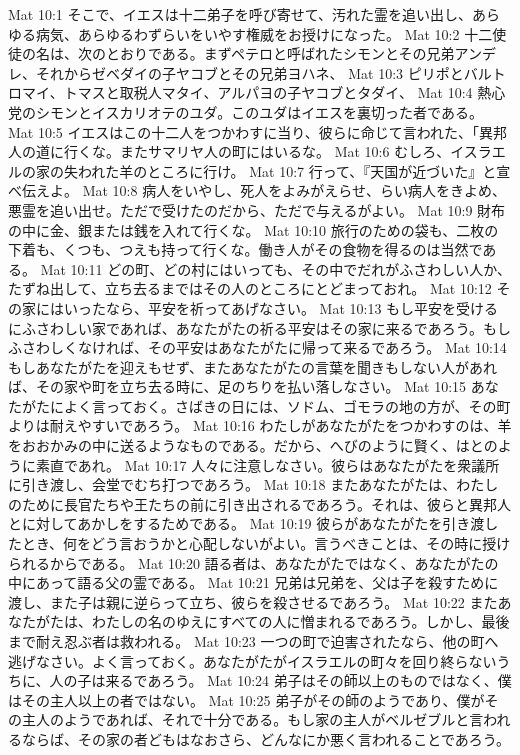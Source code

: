 Mat 10:1  そこで、イエスは十二弟子を呼び寄せて、汚れた霊を追い出し、あらゆる病気、あらゆるわずらいをいやす権威をお授けになった。
Mat 10:2  十二使徒の名は、次のとおりである。まずペテロと呼ばれたシモンとその兄弟アンデレ、それからゼベダイの子ヤコブとその兄弟ヨハネ、
Mat 10:3  ピリポとバルトロマイ、トマスと取税人マタイ、アルパヨの子ヤコブとタダイ、
Mat 10:4  熱心党のシモンとイスカリオテのユダ。このユダはイエスを裏切った者である。
Mat 10:5  イエスはこの十二人をつかわすに当り、彼らに命じて言われた、「異邦人の道に行くな。またサマリヤ人の町にはいるな。
Mat 10:6  むしろ、イスラエルの家の失われた羊のところに行け。
Mat 10:7  行って、『天国が近づいた』と宣べ伝えよ。
Mat 10:8  病人をいやし、死人をよみがえらせ、らい病人をきよめ、悪霊を追い出せ。ただで受けたのだから、ただで与えるがよい。
Mat 10:9  財布の中に金、銀または銭を入れて行くな。
Mat 10:10  旅行のための袋も、二枚の下着も、くつも、つえも持って行くな。働き人がその食物を得るのは当然である。
Mat 10:11  どの町、どの村にはいっても、その中でだれがふさわしい人か、たずね出して、立ち去るまではその人のところにとどまっておれ。
Mat 10:12  その家にはいったなら、平安を祈ってあげなさい。
Mat 10:13  もし平安を受けるにふさわしい家であれば、あなたがたの祈る平安はその家に来るであろう。もしふさわしくなければ、その平安はあなたがたに帰って来るであろう。
Mat 10:14  もしあなたがたを迎えもせず、またあなたがたの言葉を聞きもしない人があれば、その家や町を立ち去る時に、足のちりを払い落しなさい。
Mat 10:15  あなたがたによく言っておく。さばきの日には、ソドム、ゴモラの地の方が、その町よりは耐えやすいであろう。
Mat 10:16  わたしがあなたがたをつかわすのは、羊をおおかみの中に送るようなものである。だから、へびのように賢く、はとのように素直であれ。
Mat 10:17  人々に注意しなさい。彼らはあなたがたを衆議所に引き渡し、会堂でむち打つであろう。
Mat 10:18  またあなたがたは、わたしのために長官たちや王たちの前に引き出されるであろう。それは、彼らと異邦人とに対してあかしをするためである。
Mat 10:19  彼らがあなたがたを引き渡したとき、何をどう言おうかと心配しないがよい。言うべきことは、その時に授けられるからである。
Mat 10:20  語る者は、あなたがたではなく、あなたがたの中にあって語る父の霊である。
Mat 10:21  兄弟は兄弟を、父は子を殺すために渡し、また子は親に逆らって立ち、彼らを殺させるであろう。
Mat 10:22  またあなたがたは、わたしの名のゆえにすべての人に憎まれるであろう。しかし、最後まで耐え忍ぶ者は救われる。
Mat 10:23  一つの町で迫害されたなら、他の町へ逃げなさい。よく言っておく。あなたがたがイスラエルの町々を回り終らないうちに、人の子は来るであろう。
Mat 10:24  弟子はその師以上のものではなく、僕はその主人以上の者ではない。
Mat 10:25  弟子がその師のようであり、僕がその主人のようであれば、それで十分である。もし家の主人がベルゼブルと言われるならば、その家の者どもはなおさら、どんなにか悪く言われることであろう。
